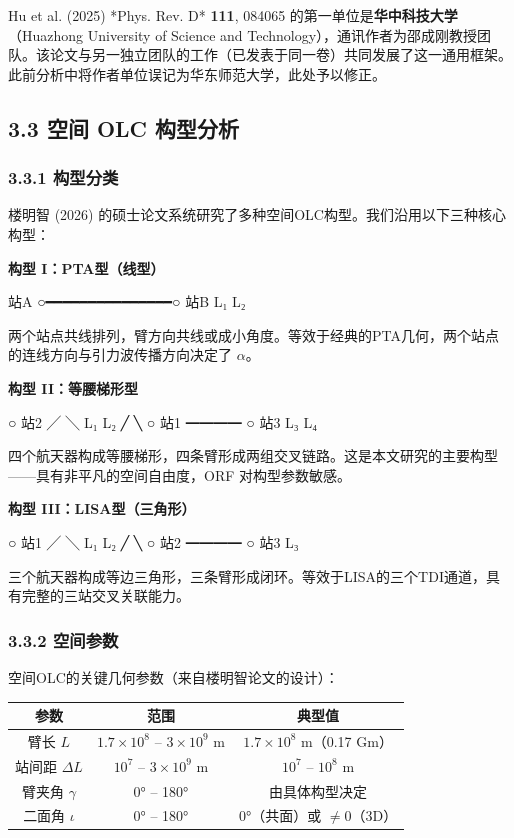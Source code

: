 \documentclass[12pt,a4paper]{article}
\begin{document}
Hu et al. (2025) *Phys. Rev. D* \textbf{111}, 084065 的第一单位是\textbf{华中科技大学}（Huazhong University of Science and Technology），通讯作者为邵成刚教授团队。该论文与另一独立团队的工作（已发表于同一卷）共同发展了这一通用框架。此前分析中将作者单位误记为华东师范大学，此处予以修正。

\subsection{3.3 空间 OLC 构型分析}


\subsubsection{3.3.1 构型分类}


楼明智 (2026) 的硕士论文系统研究了多种空间OLC构型。我们沿用以下三种核心构型：

\textbf{构型 I：PTA型（线型）}

站A ○━━━━━━━━━━━━━━━○ 站B
L₁                  L₂

两个站点共线排列，臂方向共线或成小角度。等效于经典的PTA几何，两个站点的连线方向与引力波传播方向决定了 $\alpha$。

\textbf{构型 II：等腰梯形型}

○ 站2
╱ ╲
L₁  L₂
╱     ╲
○ 站1 ━━━━ ○ 站3
L₃    L₄

四个航天器构成等腰梯形，四条臂形成两组交叉链路。这是本文研究的主要构型——具有非平凡的空间自由度，ORF 对构型参数敏感。

\textbf{构型 III：LISA型（三角形）}

○ 站1
╱ ╲
L₁  L₂
╱     ╲
○ 站2 ━━━━ ○ 站3
L₃

三个航天器构成等边三角形，三条臂形成闭环。等效于LISA的三个TDI通道，具有完整的三站交叉关联能力。

\subsubsection{3.3.2 空间参数}


空间OLC的关键几何参数（来自楼明智论文的设计）\cite{ref10}：

\begin{tabular}{|c|c|c|}
\hline
参数 & 范围 & 典型值 \\
\hline
臂长 $L$ & $1.7 \times 10^8$ – $3 \times 10^9$ m & $1.7 \times 10^8$ m（0.17 Gm） \\
站间距 $\Delta L$ & $10^7$ – $3 \times 10^9$ m & $10^7$ – $10^8$ m \\
臂夹角 $\gamma$ & 0° – 180° & 由具体构型决定 \\
二面角 $\iota$ & 0° – 180° & 0°（共面）或 $\neq 0$（3D） \\
\hline
\end{tabular}
\end{document}
